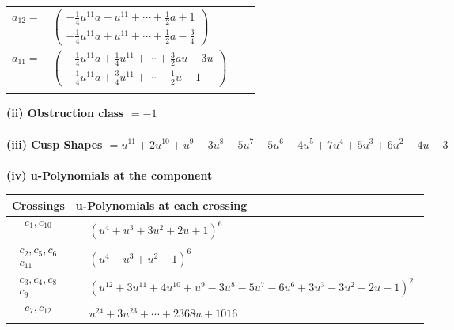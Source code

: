 \documentclass[1p]{elsarticle_modified}
\theoremstyle{definition}
\begin{document}
\begin{tabular}{m{7pt} m{180pt} m{7pt} m{180pt} }
\flushright $a_{12}=$&$\begin{pmatrix}-\frac{1}{4} u^{11} a- u^{11}+\cdots+\frac{1}{2} a+1\\-\frac{1}{4} u^{11} a+u^{11}+\cdots+\frac{1}{2} a-\frac{3}{4}\end{pmatrix}$ \\
\flushright $a_{11}=$&$\begin{pmatrix}-\frac{1}{4} u^{11} a+\frac{1}{4} u^{11}+\cdots+\frac{3}{2} a u-3 u\\-\frac{1}{4} u^{11} a+\frac{3}{4} u^{11}+\cdots-\frac{1}{2} u-1\end{pmatrix}$\\&\end{tabular}
\flushleft \textbf{(ii) Obstruction class $= -1$}\\~\\
\flushleft \textbf{(iii) Cusp Shapes $= u^{11}+2 u^{10}+u^9-3 u^8-5 u^7-5 u^6-4 u^5+7 u^4+5 u^3+6 u^2-4 u-3$}\\~\\
\newpage\renewcommand{\arraystretch}{1}
\flushleft \textbf{(iv) u-Polynomials at the component}\newline \\
\begin{tabular}{m{50pt}|m{274pt}}
Crossings & \hspace{64pt}u-Polynomials at each crossing \\
\hline $$\begin{aligned}c_{1},c_{10}\end{aligned}$$&$\begin{aligned}
&(u^4+u^3+3 u^2+2 u+1)^6
\end{aligned}$\\
\hline $$\begin{aligned}c_{2},c_{5},c_{6}\\c_{11}\end{aligned}$$&$\begin{aligned}
&(u^4- u^3+u^2+1)^6
\end{aligned}$\\
\hline $$\begin{aligned}c_{3},c_{4},c_{8}\\c_{9}\end{aligned}$$&$\begin{aligned}
&(u^{12}+3 u^{11}+4 u^{10}+u^9-3 u^8-5 u^7-6 u^6+3 u^3-3 u^2-2 u-1)^2
\end{aligned}$\\
\hline $$\begin{aligned}c_{7},c_{12}\end{aligned}$$&$\begin{aligned}
&u^{24}+3 u^{23}+\cdots+2368 u+1016
\end{aligned}$\\
\hline
\end{tabular}\\~\\
\end{document}
